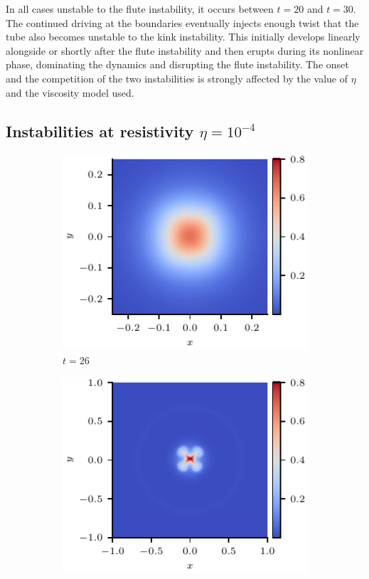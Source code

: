 \documentclass[fleqn,usenatbib]{mnras}
\newcommand{\rev}[1]{{\color{red} {#1}}}
\begin{document}
In all cases unstable to the flute instability, it occurs  between $t=20$ and
$t=30$. The continued driving at the boundaries eventually injects enough twist
that the tube also becomes unstable to the kink instability. This initially
develops linearly alongside or shortly after the flute instability and then
\rev{erupts during its nonlinear phase}, dominating the dynamics and disrupting
the   flute instability. The onset and the competition of the two instabilities
is strongly affected by the value of $\eta$ and the viscosity model used. 

\subsection{Instabilities at resistivity $\eta=10^{-4}$}

\begin{figure}
  \centering
    \begin{subfigure}{0.32\textwidth}
      \includegraphics[width=\linewidth]{swi-4_pressure_13.pdf}
      \caption{$t=26$}
      \label{fig:swi-4_pressure_13}
    \end{subfigure}
    \hfill
    \begin{subfigure}{0.32\textwidth}
      \includegraphics[width=\linewidth]{swi-4_pressure_14.pdf}

\end{subfigure}
\end{figure}
\end{document}
